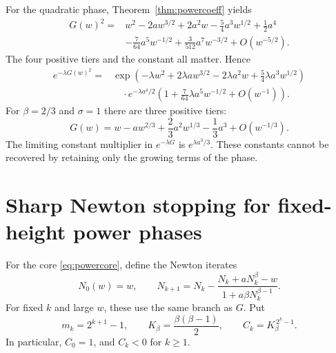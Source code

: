 \documentclass[11pt,a4paper]{article}
\theoremstyle{definition}
\theoremstyle{remark}
\numberwithin{equation}{section}
\begin{document}
For the quadratic phase, Theorem~\ref{thm:powercoeff} yields
\begin{align}
 G(w)^2={}&w^2-2aw^{3/2}+2a^2w-\frac54a^3w^{1/2}
 +\frac12a^4\nonumber\\
 &-\frac7{64}a^5w^{-1/2}+\frac3{512}a^7w^{-3/2}
 +O(w^{-5/2}).\label{eq:Gsquare}
\end{align}
The four positive tiers and the constant all matter. Hence
\begin{align}
 e^{-\lambda G(w)^2}
 ={}&\exp\left(-\lambda w^2+2\lambda aw^{3/2}
 -2\lambda a^2w+\frac54\lambda a^3w^{1/2}\right)
 \nonumber\\[-1mm]
 &\quad\cdot e^{-\lambda a^4/2}
 \left(1+\frac7{64}\lambda a^5w^{-1/2}+O(w^{-1})\right).
 \label{eq:quadraticphaseexample}
\end{align}
For $\beta=2/3$ and $\sigma=1$ there are three positive tiers:
\[
 G(w)=w-aw^{2/3}+\frac23a^2w^{1/3}-\frac13a^3+O(w^{-1/3}).
\]
The limiting constant multiplier in $e^{-\lambda G}$ is $e^{\lambda a^3/3}$. These constants cannot be recovered by retaining only the growing terms of the phase.

\section{Sharp Newton stopping for fixed-height power phases}\label{sec:newton}

For the core \eqref{eq:powercore}, define the Newton iterates
\begin{equation}\label{eq:newton}
 N_0(w)=w,\qquad
 N_{k+1}=N_k-\frac{N_k+aN_k^\beta-w}{1+a\beta N_k^{\beta-1}}.
\end{equation}
For fixed $k$ and large $w$, these use the same branch as $G$. Put
\[
 m_k=2^{k+1}-1,\qquad K_\beta=\frac{\beta(\beta-1)}{2},
 \qquad C_k=K_\beta^{\,2^k-1}.
\]
In particular, $C_0=1$, and $C_k<0$ for $k\ge1$.
\end{document}
